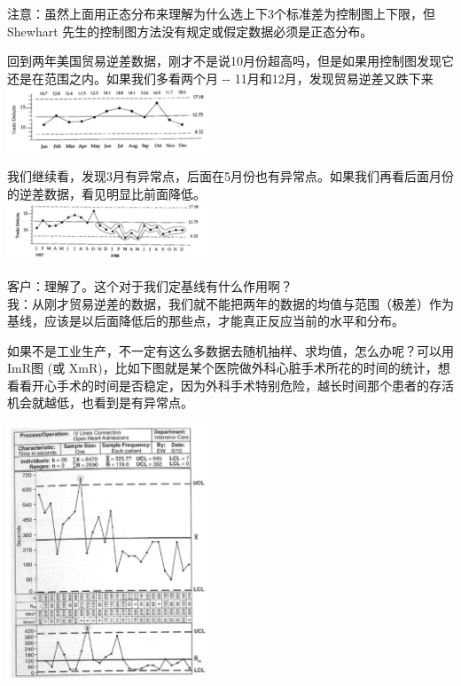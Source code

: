 注意：虽然上面用正态分布来理解为什么选上下3个标准差为控制图上下限，但Shewhart
先生的控制图方法没有规定或假定数据必须是正态分布。

回到两年美国贸易逆差数据，刚才不是说10月份超高吗，但是如果用控制图发现它还是在范围之内。如果我们多看两个月
-\/- 11月和12月，发现贸易逆差又跌下来\\

\includegraphics[width=6cm]{The_key_fig2811.png}

我们继续看，发现3月有异常点，后面在5月份也有异常点。如果我们再看后面月份的逆差数据，看见明显比前面降低。\\

\includegraphics[width=6cm]{The_key_fig21111.png}

客户：理解了。这个对于我们定基线有什么作用啊？\\
我：从刚才贸易逆差的数据，我们就不能把两年的数据的均值与范围（极差）作为基线，应该是以后面降低后的那些点，才能真正反应当前的水平和分布。

如果不是工业生产，不一定有这么多数据去随机抽样、求均值，怎么办呢？可以用ImR图
(或
XmR)，比如下图就是某个医院做外科心脏手术所花的时间的统计，想看看开心手术的时间是否稳定，因为外科手术特别危险，越长时间那个患者的存活机会就越低，也看到是有异常点。


\includegraphics[width=6cm]{控制图081.png}

